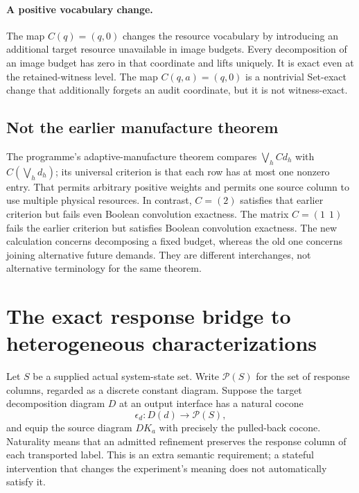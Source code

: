 \paragraph{A positive vocabulary change.}
The map $C(q)=(q,0)$ changes the resource vocabulary by introducing an
additional target resource unavailable in image budgets. Every decomposition
of an image budget has zero in that coordinate and lifts uniquely. It is
exact even at the retained-witness level. The map $C(q,a)=(q,0)$ is a
nontrivial Set-exact change that additionally forgets an audit coordinate,
but it is not witness-exact.

\subsection{Not the earlier manufacture theorem}
The programme's adaptive-manufacture theorem compares
$\bigvee_h Cd_h$ with $C(\bigvee_h d_h)$; its universal criterion is
that each row has at most one nonzero entry. That permits arbitrary
positive weights and permits one source column to use multiple physical
resources. In contrast, $C=(2)$ satisfies that earlier criterion but
fails even Boolean convolution exactness. The matrix $C=(1\ \ 1)$
fails the earlier criterion but satisfies Boolean convolution exactness.
The new calculation concerns decomposing a fixed budget, whereas the old
one concerns joining alternative future demands. They are different
interchanges, not alternative terminology for the same theorem.

\section{The exact response bridge to heterogeneous characterizations}\label{sec:slice}
Let $S$ be a supplied actual system-state set. Write $\mathcal P(S)$
for the set of response columns, regarded as a discrete constant diagram.
Suppose the target decomposition diagram $D$ at an output interface has
a natural cocone
\[
 \epsilon_d:D(d)\longrightarrow\mathcal P(S),
\]
and equip the source diagram $DK_a$ with precisely the pulled-back cocone.
Naturality means that an admitted refinement preserves the response
column of each transported label. This is an extra semantic requirement;
a stateful intervention that changes the experiment's meaning does not
automatically satisfy it.

